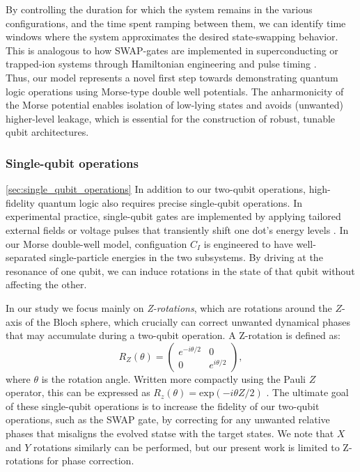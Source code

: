 \documentclass{subfiles}
\begin{document}
By controlling the duration for which the system remains in the various configurations, and the time spent ramping between them, we can identify time windows where the system approximates the desired state-swapping behavior. This is analogous to how SWAP-gates are implemented in superconducting or trapped-ion systems through Hamiltonian engineering and pulse timing \cite{picard2025entanglement}. \\

Thus, our model represents a novel first step towards demonstrating quantum logic operations using Morse-type double well potentials. The anharmonicity of the Morse potential enables isolation of low-lying states and avoids (unwanted) higher-level leakage, which is essential for the construction of robust, tunable qubit architectures\cite{nielsen2010quantum}.

\subsubsection*{Single-qubit operations}\ref{sec:single_qubit_operations}
In addition to our two-qubit operations, high-fidelity quantum logic also requires precise single-qubit operations.  In experimental practice, single-qubit gates are implemented by applying tailored external fields or voltage pulses that transiently shift one dot's energy levels \cite{mcdermott2014accurate}. In our Morse double-well model, configuation $C_I$ is engineered to have well-separated single-particle energies in the two subsystems. By driving at the resonance of one qubit, we can induce rotations in the state of that qubit without affecting the other. 

In our study we focus mainly on \emph{Z-rotations}, which are rotations around the $Z$-axis of the Bloch sphere, which crucially can correct unwanted dynamical phases that may accumulate during a two-qubit operation. A Z-rotation is defined as:
\begin{equation}
    R_Z(\theta) = \begin{pmatrix}
    e^{-i\theta/2} & 0 \\
    0 & e^{i\theta/2}
    \end{pmatrix} \label{eq:z_rotation_gate},
\end{equation}
where $\theta$ is the rotation angle. Written more compactly using the Pauli $Z$ operator, this can be expressed as $R_z(\theta) = \text{exp}(-i\theta Z/2)$ \cite{nielsen2010quantum}. The ultimate goal of these single-qubit operations is to increase the fidelity of our two-qubit operations, such as the SWAP gate, by correcting for any unwanted relative phases that misaligns the evolved statse with the target states. We note that $X$ and $Y$ rotations similarly can be performed, but our present work is limited to Z-rotations for phase correction.
\end{document}
